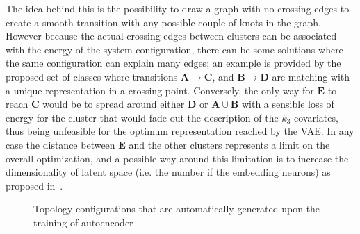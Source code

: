 The idea behind this is the possibility to draw a graph with no crossing edges to create a smooth transition with any possible couple of knots in the graph. However because the actual crossing edges between clusters can be associated with the energy of the system configuration, there can be some solutions where the same configuration can explain many edges; an example is provided by the proposed set of classes where transitions $\bm{A} \rightarrow \bm{C}$, and $\bm{B} \rightarrow \bm{D}$ are matching with a unique representation in a crossing point. 
Conversely, the only way for $\bm{E}$ to reach $\bm{C}$ would be to spread around either $\bm{D}$ or $\bm{A}\cup\bm{B}$ with a sensible loss of energy for the cluster that would fade out the description of the $k_3$ covariates, thus being unfeasible for the optimum representation reached by the \acs{VAE}.
In any case the distance between $\bm{E}$ and the other clusters represents a limit on the overall optimization, and a possible way around this limitation is to increase the dimensionality of latent space (i.e. the number if the embedding neurons) as proposed in~\Figure{\ref{fig:voronoi_3d}}.
\begin{figure}
    \centering
    \caption{Topology configurations that are automatically generated upon the training of autoencoder } 
    \label{fig:voronoi}
\end{figure}

